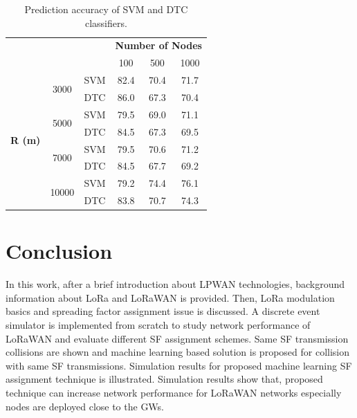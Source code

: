 \documentclass[conference]{IEEEtran}
\begin{document}
\begin{table}
\centering
\caption{Prediction accuracy of SVM and DTC classifiers.}
\label{table:prediction_accuracy}
\begin{tabular}{|c|c|c|c|c|c|}
\hline
\multicolumn{3}{|c|}{\multirow{2}{*}{}}                        & \multicolumn{3}{c|}{\textbf{Number of Nodes}} \\ \cline{4-6}
\multicolumn{3}{|c|}{}                                         & 100           & 500           & 1000          \\ \hline
\multirow{8}{*}{\textbf{R (m)}} & \multirow{2}{*}{3000}  & SVM & 82.4          & 70.4          & 71.7          \\ \cline{3-6}
                                &                        & DTC & 86.0          & 67.3          & 70.4          \\ \cline{2-6}

                                & \multirow{2}{*}{5000}  & SVM & 79.5          & 69.0          & 71.1          \\ \cline{3-6}
                                &                        & DTC & 84.5          & 67.3          & 69.5          \\ \cline{2-6}

                                & \multirow{2}{*}{7000}  & SVM & 79.5          & 70.6          & 71.2          \\ \cline{3-6}
                                &                        & DTC & 84.5          & 67.7          & 69.2          \\ \cline{2-6}

                                & \multirow{2}{*}{10000} & SVM & 79.2          & 74.4          & 76.1          \\ \cline{3-6}
                                &                        & DTC & 83.8          & 70.7          & 74.3          \\ \hline
\end{tabular}
\end{table}


\section{Conclusion} \label{Conclusion}
\par In this work, after a brief introduction about LPWAN technologies, background information about LoRa and LoRaWAN is provided. Then, LoRa modulation basics and spreading factor assignment issue is  discussed. A discrete event simulator is implemented from scratch to study network performance of LoRaWAN and evaluate different SF assignment schemes. Same SF transmission collisions are shown and machine learning based solution is proposed for collision with same SF transmissions. Simulation results for proposed machine learning SF assignment technique is illustrated. Simulation results show that, proposed technique can increase network performance for LoRaWAN networks especially nodes are deployed close to the GWs.
\end{document}
